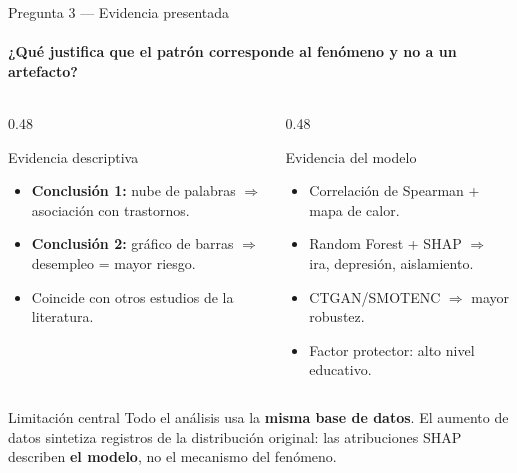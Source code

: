 \documentclass[aspectratio=169,11pt]{beamer}
\begin{document}
\begin{frame}[shrink=5]{Pregunta 3 — Evidencia presentada}
  \framesubtitle{¿Qué justifica que el patrón corresponde al fenómeno y no a un artefacto?}
  \begin{columns}[T]
    \begin{column}{0.48\textwidth}
      \begin{block}{Evidencia descriptiva}
        \small
        \begin{itemize}
          \item \textbf{Conclusión 1:} nube de palabras $\Rightarrow$ asociación con trastornos.
          \item \textbf{Conclusión 2:} gráfico de barras $\Rightarrow$ desempleo = mayor riesgo.
          \item Coincide con otros estudios de la literatura.
        \end{itemize}
      \end{block}
    \end{column}
    \begin{column}{0.48\textwidth}
      \begin{block}{Evidencia del modelo}
        \small
        \begin{itemize}
          \item Correlación de Spearman + mapa de calor.
          \item Random Forest + SHAP $\Rightarrow$ ira, depresión, aislamiento.
          \item CTGAN/SMOTENC $\Rightarrow$ mayor robustez.
          \item Factor protector: alto nivel educativo.
        \end{itemize}
      \end{block}
    \end{column}
  \end{columns}
  \vspace{0em}
  \begin{alertblock}{Limitación central}
    \small
    Todo el análisis usa la \textbf{misma base de datos}. El aumento de datos
    sintetiza registros de la distribución original: las atribuciones SHAP
    describen \textbf{el modelo}, no el mecanismo del fenómeno.
  \end{alertblock}
\end{frame}
\end{document}
